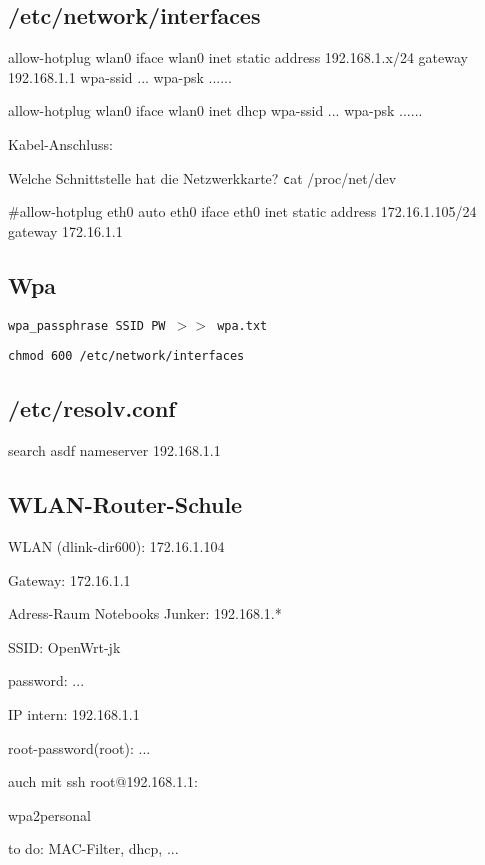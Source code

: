 \subsection{/etc/network/interfaces}


\begin{verbbox}
allow-hotplug wlan0
iface wlan0 inet static
    address 192.168.1.x/24
    gateway 192.168.1.1
    wpa-ssid ...
    wpa-psk  ......
\end{verbbox}
\fbox{\theverbbox}

\begin{verbbox}
allow-hotplug wlan0
iface wlan0 inet dhcp 
    wpa-ssid ...
    wpa-psk  ......
\end{verbbox}
\fbox{\theverbbox}

Kabel-Anschluss:

Welche Schnittstelle hat die Netzwerkkarte?
{\texttt cat /proc/net/dev}



\begin{verbbox}
#allow-hotplug eth0
auto eth0
iface eth0 inet static
		address 172.16.1.105/24
		gateway 172.16.1.1
\end{verbbox}
\fbox{\theverbbox}



\subsection{Wpa}

\texttt{wpa\_passphrase SSID PW $>>$ wpa.txt}

\texttt{chmod 600 /etc/network/interfaces}


\subsection{/etc/resolv.conf}
\begin{verbbox}
search asdf
nameserver 192.168.1.1
\end{verbbox}
\fbox{\theverbbox}


\subsection{WLAN-Router-Schule}


WLAN (dlink-dir600): 172.16.1.104

Gateway: 172.16.1.1

Adress-Raum Notebooks Junker: 192.168.1.*
 
SSID: OpenWrt-jk

password: ...

IP intern: 192.168.1.1  

root-password(root): ...

auch mit ssh root@192.168.1.1: 

wpa2personal

to do: MAC-Filter, dhcp, ...
 
